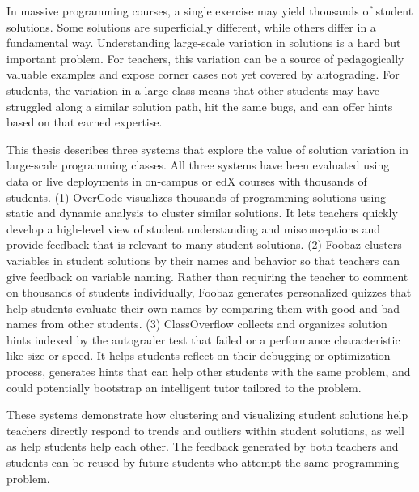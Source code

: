%
%
%

In massive programming courses, a single exercise may yield thousands of student solutions. Some solutions are superficially different, while others differ in a fundamental way. Understanding large-scale variation in solutions is a hard but important problem. For teachers, this variation can be a source of pedagogically valuable examples and expose corner cases not yet covered by autograding. For students, the variation in a large class means that other students may have struggled along a similar solution path, hit the same bugs, and can offer hints based on that earned expertise.

This thesis describes three systems that explore the value of solution variation in large-scale programming classes. All three systems have been evaluated using data or live deployments in on-campus or edX courses with thousands of students. (1) OverCode visualizes thousands of programming solutions using static and dynamic analysis to cluster similar solutions. It lets teachers quickly develop a high-level view of student understanding and misconceptions and provide feedback that is relevant to many student solutions. (2) Foobaz clusters variables in student solutions by their names and behavior so that teachers can give feedback on variable naming. Rather than requiring the teacher to comment on thousands of students individually, Foobaz generates personalized quizzes that help students evaluate their own names by comparing them with good and bad names from other students. (3) ClassOverflow collects and organizes solution hints indexed by the autograder test that failed or a performance characteristic like size or speed. It helps students reflect on their debugging or optimization process, generates hints that can help other students with the same problem, and could potentially bootstrap an intelligent tutor tailored to the problem.

These systems demonstrate how clustering and visualizing student solutions help teachers directly respond to trends and outliers within student solutions, as well as help students help each other. The feedback generated by both teachers and students can be reused by future students who attempt the same programming problem.


